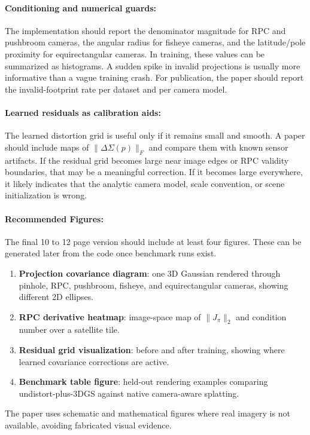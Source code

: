 \documentclass{article}
\begin{document}
\paragraph{Conditioning and numerical guards:}

The implementation should report the denominator magnitude for RPC and pushbroom cameras, the angular radius for fisheye cameras, and the latitude/pole proximity for equirectangular cameras. In training, these values can be summarized as histograms. A sudden spike in invalid projections is usually more informative than a vague training crash. For publication, the paper should report the invalid-footprint rate per dataset and per camera model.

\paragraph{Learned residuals as calibration aids:}

The learned distortion grid is useful only if it remains small and smooth. A paper should include maps of $\|\Delta\Sigma(p)\|_F$ and compare them with known sensor artifacts. If the residual grid becomes large near image edges or RPC validity boundaries, that may be a meaningful correction. If it becomes large everywhere, it likely indicates that the analytic camera model, scale convention, or scene initialization is wrong.

\paragraph{Recommended Figures:}

The final 10 to 12 page version should include at least four figures. These can be generated later from the code once benchmark runs exist.
\begin{enumerate}
  \item \textbf{Projection covariance diagram}: one 3D Gaussian rendered through pinhole, RPC, pushbroom, fisheye, and equirectangular cameras, showing different 2D ellipses.
  \item \textbf{RPC derivative heatmap}: image-space map of $\|J_{\pi}\|_2$ and condition number over a satellite tile.
  \item \textbf{Residual grid visualization}: before and after training, showing where learned covariance corrections are active.
  \item \textbf{Benchmark table figure}: held-out rendering examples comparing undistort-plus-3DGS against native camera-aware splatting.
\end{enumerate}
The paper uses schematic and mathematical figures where real imagery is not available, avoiding fabricated visual evidence.
\end{document}
